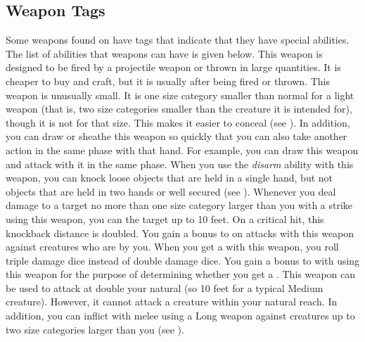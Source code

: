     \subsection{Weapon Tags}\label{Weapon Tags}
        Some weapons found on  have tags that indicate that they have special abilities. The list of abilities that weapons can have is given below.
         This weapon is designed to be fired by a projectile weapon or thrown in large quantities.
        It is cheaper to buy and craft, but it is usually  after being fired or thrown.
         This weapon is unusually small.
        It is one size category smaller than normal for a light weapon (that is, two size categories smaller than the creature it is intended for), though it is not  for that size.
        This makes it easier to conceal (see ).
        In addition, you can draw or sheathe this weapon so quickly that you can also take another action in the same phase with that hand.
        For example, you can draw this weapon and attack with it in the same phase.
         When you use the \textit{disarm} ability with this weapon, you can knock loose objects that are held in a single hand, but not objects that are held in two hands or well secured (see ).
         Whenever you deal damage to a target no more than one size category larger than you with a strike using this weapon, you can  the target up to 10 feet.
        On a critical hit, this knockback distance is doubled.
         You gain a  bonus to  on  attacks with this weapon against creatures who are \grappled by you.
         When you get a  with this weapon, you roll triple damage dice instead of double damage dice.
         You gain a  bonus to  with  using this weapon for the purpose of determining whether you get a .
        \label{Long Weapon} This weapon can be used to attack at double your natural  (so 10 feet for a typical Medium creature).
        However, it cannot attack a creature within your natural reach.
        In addition, you can inflict  with melee  using a Long weapon against creatures up to two size categories larger than you (see ).

